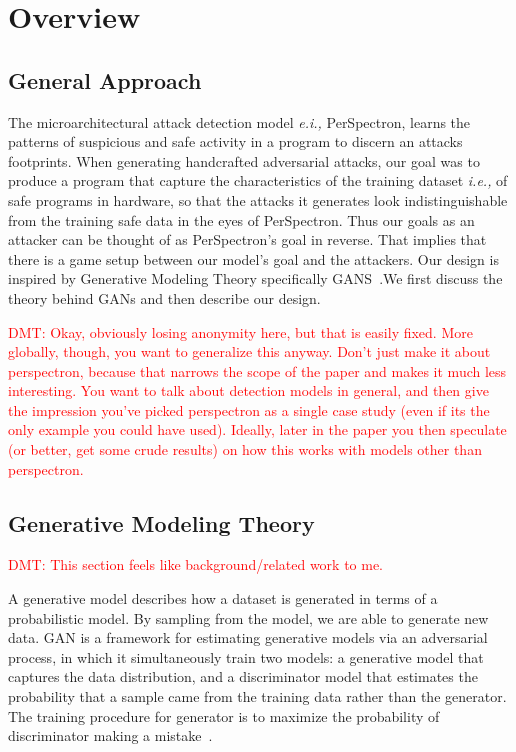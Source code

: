 \section{ Overview}\label{overview}
\subsection{General Approach}

 The microarchitectural attack detection model {\em e.i.,} PerSpectron, learns the patterns of suspicious and safe activity in a program to discern an attacks footprints.
When generating handcrafted adversarial attacks, our goal was to produce a program that capture the characteristics of the training dataset {\em i.e., } of safe programs in hardware, so that the attacks it generates look indistinguishable from the training safe data in the eyes of PerSpectron. Thus our goals as an attacker can be thought of as PerSpectron's goal in reverse. That implies that there is a game setup between our model's goal and the attackers. Our design is inspired by Generative Modeling Theory specifically GANS~\cite{goodfellow2014generative}.We first discuss the theory behind GANs and then describe our design.  

\textcolor{red}{DMT: Okay, obviously losing anonymity here, but that is easily fixed.  More globally,
though, you want to generalize this anyway.  Don't just make it about perspectron, because that 
narrows the scope of the paper and makes it much less interesting.  You want to talk about detection
models in general, and then give the impression you've picked perspectron as a single case study (even
if its the only example you could have used).  Ideally, later in the paper you then speculate (or better,
get some crude results) on how this works with models other than perspectron.}

\subsection{Generative Modeling Theory}

\textcolor{red}{DMT: This section feels like background/related work to me.}

A generative model describes how a dataset is generated in
terms of a probabilistic model. By sampling from the model,
we are able to generate new data. GAN is a framework for
estimating generative models via an adversarial process, in
which it simultaneously train two models: a generative model
that captures the data distribution, and a discriminator model
that estimates the probability that a sample came from the
training data rather than the generator. The training procedure
for generator is to maximize the probability of discriminator
making a mistake~\cite{goodfellow2014generative}.

